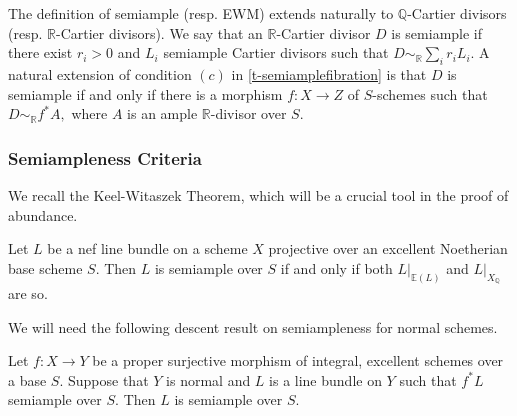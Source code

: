 \documentclass[a4paper,12pt]{book}
\begin{document}
	The definition of semiample (resp. EWM) extends naturally to $\mathbb{Q}$-Cartier divisors (resp. $\mathbb{R}$-Cartier divisors).
	We say that an $\mathbb{R}$-Cartier divisor $D$ is semiample if there exist $r_i>0$ and $L_i$ semiample Cartier divisors such that $D \sim_{\mathbb{R}}\sum_i r_{i}L_{i}$. A natural extension of condition $(c)$ in \autoref{t-semiamplefibration} is that $D$ is semiample if and only if there is a morphism $f \colon X \to Z$ of $S$-schemes such that $D\sim_{\mathbb{R}} f^*A,$ where $A$ is an ample $\mathbb{R}$-divisor over $S$.
	
	\subsubsection{Semiampleness Criteria}
	
	We recall the Keel-Witaszek Theorem, which will be a crucial tool in the proof of abundance.
	
	\begin{theorem}
		Let $L$ be a nef line bundle on a scheme $X$
		projective over an excellent Noetherian base scheme $S$. Then $L$ is semiample over $S$ if and only if both $L|_{\mathbb{E}(L)}$ and $L|_{X_{\mathbb{Q}}}$
		are so.
	\end{theorem}
	
	We will need the following descent result on semiampleness for normal schemes.
	
	\begin{lemma}\label{pullback}
		
		Let $f \colon X \to Y$ be a proper surjective morphism of integral, excellent schemes over a base $S$. Suppose that $Y$ is normal and $L$  is a line bundle on $Y$ such that $f^{*}L$ semiample over $S$.
		Then $L$ is semiample over $S$.
		
	\end{lemma}
	
\end{document}
